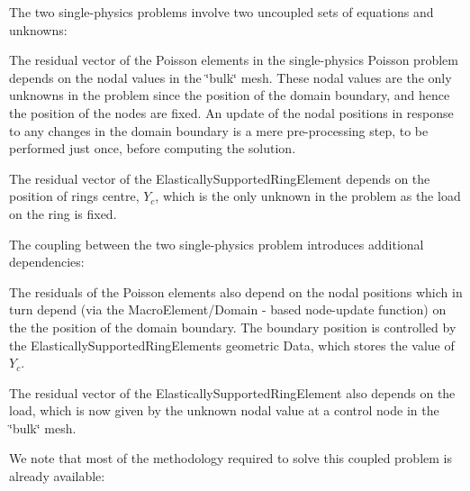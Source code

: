 The two single-\/physics problems involve two uncoupled sets of equations and unknowns\+:
\begin{DoxyItemize}
\item The residual vector of the Poisson elements in the single-\/physics Poisson problem depends on the nodal values in the \char`\"{}bulk\char`\"{} mesh. These nodal values are the only unknowns in the problem since the position of the domain boundary, and hence the position of the nodes are fixed. An update of the nodal positions in response to any changes in the domain boundary is a mere pre-\/processing step, to be performed just once, before computing the solution.
\item The residual vector of the {\ttfamily Elastically\+Supported\+Ring\+Element} depends on the position of ring\textquotesingle{}s centre, $ Y_c $, which is the only unknown in the problem as the load on the ring is fixed.
\end{DoxyItemize}The coupling between the two single-\/physics problem introduces additional dependencies\+:
\begin{DoxyItemize}
\item The residuals of the Poisson elements also depend on the nodal positions which in turn depend (via the {\ttfamily Macro\+Element/\+Domain} -\/ based node-\/update function) on the the position of the domain boundary. The boundary position is controlled by the {\ttfamily Elastically\+Supported\+Ring\+Element\textquotesingle{}s} geometric {\ttfamily Data}, which stores the value of $ Y_c $.
\item The residual vector of the {\ttfamily Elastically\+Supported\+Ring\+Element} also depends on the load, which is now given by the unknown nodal value at a control node in the \char`\"{}bulk\char`\"{} mesh.
\end{DoxyItemize}We note that most of the methodology required to solve this coupled problem is already available\+:
